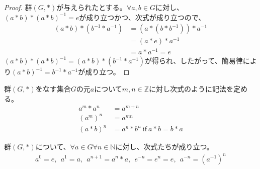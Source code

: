 \documentclass[dvipdfmx]{jsarticle}
\begin{document}
\begin{proof}
群$(G,*)$が与えられたとする。$\forall a,b \in G$に対し、$(a*b)*(a*b)^{- 1} = e$が成り立つかつ、次式が成り立つので、
\begin{align*}
(a*b)*\left( b^{- 1}*a^{- 1} \right) &= \left( a*\left( b*b^{- 1} \right) \right)*a^{- 1}\\
&= (a*e)*a^{- 1}\\
&= a*a^{- 1} = e
\end{align*}
$(a*b)*(a*b)^{- 1} = (a*b)*\left( b^{- 1}*a^{- 1} \right)$が得られ、したがって、簡易律により$(a*b)^{- 1} = b^{- 1}*a^{- 1}$が成り立つ。
\end{proof}
\begin{dfn}
群$(G,*)$をなす集合$G$の元$a$について$m,n \in \mathbb{Z}$に対し次式のように記法を定める。
\begin{align*}
a^{m}*a^{n} &= a^{m + n}\\
\left( a^{m} \right)^{n} &= a^{mn}\\
(a*b)^{n} &= a^{n}*b^{n}\ \mathrm{if}\ a*b = b*a
\end{align*}
\end{dfn}
\begin{thm}\label{2.1.1.4}
群$(G,*)$について、$\forall a \in G\forall n \in \mathbb{N}$に対し、次式たちが成り立つ。
\begin{align*}
a^{0} = e,\ \ a^{1} = a,\ \ a^{n + 1} = a^{n}*a,\ \ e^{- n} = e^{n} = e,\ \ a^{- n} = \left( a^{- 1} \right)^{n}
\end{align*}
\end{thm}
\end{document}
